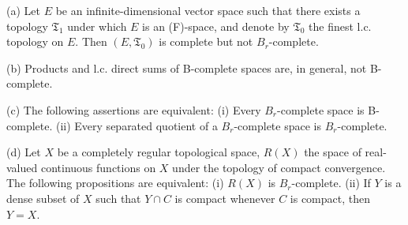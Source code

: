 (a) Let $E$ be an infinite-dimensional vector space such that there exists a topology $\mathfrak{T}_1$ under which $E$ is an (F)-space, and denote by $\mathfrak{T}_0$ the finest l.c. topology on $E$. Then $(E, \mathfrak{T}_0)$ is complete but not $B_r$-complete.

(b) Products and l.c. direct sums of B-complete spaces are, in general, not B-complete.

(c) The following assertions are equivalent: (i) Every $B_r$-complete space is B-complete. (ii) Every separated quotient of a $B_r$-complete space is $B_r$-complete.

(d) Let $X$ be a completely regular topological space, $R(X)$ the space of real-valued continuous functions on $X$ under the topology of compact convergence. The following propositions are equivalent: (i) $R(X)$ is $B_r$-complete. (ii) If $Y$ is a dense subset of $X$ such that $Y \cap C$ is compact whenever $C$ is compact, then $Y = X$.
